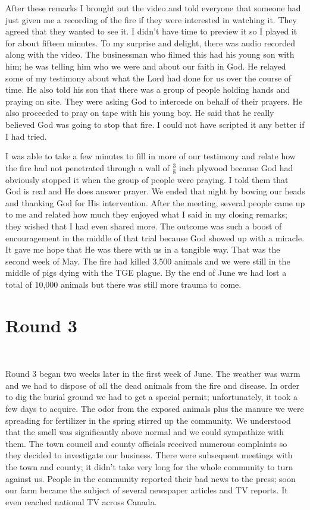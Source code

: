 \documentclass[twoside, 12pt]{book}
\begin{document}
After these remarks I brought out the video and told everyone that someone had just given me a recording of the fire if they were interested in watching it. They agreed that they wanted to see it. I didn't have time to preview it so I played it for about fifteen minutes. To my surprise and delight, there was audio recorded along with the video. The businessman who filmed this had his young son with him; he was telling him who we were and about our faith in God. He relayed some of my testimony about what the Lord had done for us over the course of time. He also told his son that there was a group of people holding hands and praying on site. They were asking God to intercede on behalf of their prayers. He also proceeded to pray on tape with his young boy. He said that he really believed God was going to stop that fire. I could not have scripted it any better if I had tried. 

I was able to take a few minutes to fill in more of our testimony and relate how the fire had not penetrated through a wall of $\frac{3}{8}$ inch plywood because God had obviously stopped it when the group of people were praying. I told them that God is real and He does answer prayer. We ended that night by bowing our heads and thanking God for His intervention. After the meeting, several people came up to me and related how much they enjoyed what I said in my closing remarks; they wished that I had even shared more. The outcome was such a boost of encouragement in the middle of that trial because God showed up with a miracle. It gave me hope that He was there with us in a tangible way. That was the second week of May. The fire had killed 3,500 animals and we were still in the middle of pigs dying with the TGE plague. By the end of June we had lost a total of 10,000 animals but there was still more trauma to come.


\section{Round 3}
\

Round 3 began two weeks later in the first week of June. The weather was warm and we had to dispose of all the dead animals from the fire and disease. In order to dig the burial ground we had to get a special permit; unfortunately, it took a few days to acquire. The odor from the exposed animals plus the manure we were spreading for fertilizer in the spring stirred up the community. We understood that the smell was significantly above normal and we could sympathize with them. The town council and county officials received numerous complaints so they decided to investigate our business. There were subsequent meetings with the town and county; it didn't take very long for the whole community to turn against us. People in the community reported their bad news to the press; soon our farm became the subject of several newspaper articles and TV reports. It even reached national TV across Canada. 
\end{document}
